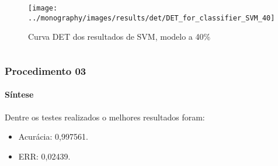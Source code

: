 \begin{frame}
{\begin{columns}
			\begin{figure}
				\centering
				\texttt{[image: ../monography/images/results/det/DET\_for\_classifier\_SVM\_40]}
				\caption{Curva DET dos resultados de SVM, modelo a 40\%}
			\end{figure}
		\end{columns}
	}
\end{frame}

\begin{frame}
	\frametitle{Procedimento 03}
	\framesubtitle{Síntese}
	\par Dentre os testes realizados o melhores resultados foram:
	\begin{itemize}
		\item Acurácia: 0,997561.
		\item ERR: 0,02439.
	\end{itemize}
\end{frame}